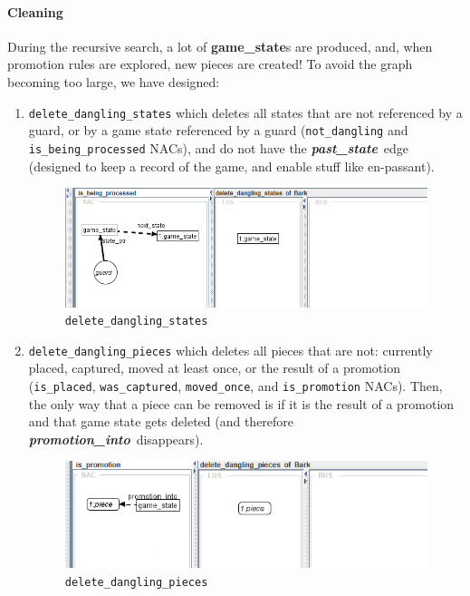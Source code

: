 \documentclass[a4paper, 10pt]{scrartcl}
\newcommand{\noderepr}[1]{\textsf{\textbf{#1}}}
\newcommand{\edgerepr}[1]{\textit{\textbf{#1}}}
\newcommand{\gamestate}{\noderepr{game\_state}}
\newcommand{\promotioninto}{\edgerepr{promotion\_into}}
\newcommand{\paststate}{\edgerepr{past\_state}}
\begin{document}
    \paragraph*{Cleaning} During the recursive search, a lot of \gamestate s are produced, and, when promotion rules are explored, new pieces are created! To avoid the graph becoming too large, we have designed:
    \begin{enumerate}
        \item \texttt{delete\_dangling\_states} which deletes all states that are not referenced by a guard, or by a game state referenced by a guard (\texttt{not\_dangling} and \texttt{is\_being\_processed} NACs), and do not have the \paststate\ edge (designed to keep a record of the game, and enable stuff like en-passant).
        \begin{figure}[H]
            \centering
            \includegraphics[width=.8\linewidth]{images/delete_dangling_states.png}
            \caption{\texttt{delete\_dangling\_states}}
        \end{figure}
        \item \texttt{delete\_dangling\_pieces} which deletes all pieces that are not: currently placed, captured, moved at least once, or the result of a promotion (\texttt{is\_placed}, \texttt{was\_captured}, \texttt{moved\_once}, and \texttt{is\_promotion} NACs). Then, the only way that a piece can be removed is if it is the result of a promotion and that game state gets deleted (and therefore \promotioninto\ disappears).
        \begin{figure}[H]
            \centering
            \includegraphics[width=.8\linewidth]{images/delete_dangling_pieces.png}
            \caption{\texttt{delete\_dangling\_pieces}}
        \end{figure} 
    \end{enumerate}
\end{document}
